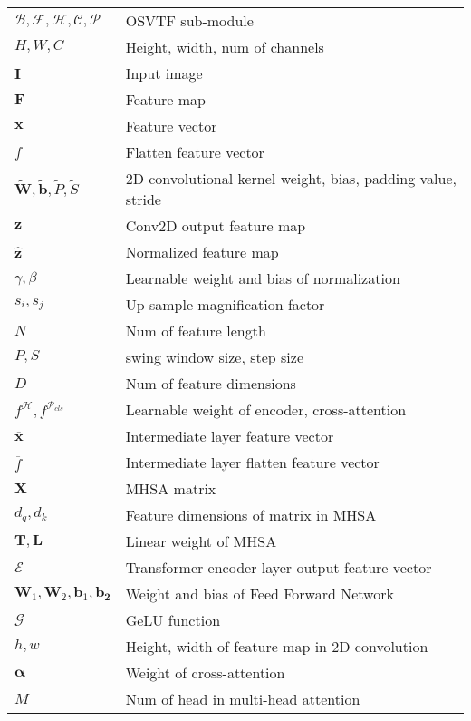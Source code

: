 \begin{tabular}{@{} l @{\hspace{3em}} l @{}}
    $\mathcal{B}, \mathcal{F}, \mathcal{H}, \mathcal{C}, \mathcal{P}$ & OSVTF sub-module \\
    $H, W, C$ & Height, width, num of channels \\
    $\mathbf{I}$ & Input image \\
    $\mathbf{F}$ & Feature map \\
    $\boldsymbol{x}$ & Feature vector \\
    $f$ & Flatten feature vector \\
    $\tilde{\mathbf{W}}, \tilde{\mathbf{b}}, \tilde{P}, \tilde{S}$ & 2D convolutional kernel weight, bias, padding value, stride \\
    $\mathbf{z}$ & Conv2D output feature map \\
    $\hat{\mathbf{z}}$ & Normalized feature map \\
    $\gamma, \beta$ & Learnable weight and bias of normalization \\
    $s_i, s_j$ & Up-sample magnification factor \\
    $N$ & Num of feature length \\
    $P, S$ & swing window size, step size \\
    $D$ & Num of feature dimensions \\
    $f^\mathcal{H}, f^{\mathcal{P}_{cls}}$ & Learnable weight of encoder, cross-attention \\
    $\overline{\boldsymbol{x}}$ & Intermediate layer feature vector \\
    $\overline{f}$ & Intermediate layer flatten feature vector \\
    $\boldsymbol{X}$ & MHSA matrix \\
    $d_q, d_k$ & Feature dimensions of matrix in MHSA \\
    $\mathbf{T}, \mathbf{L}$ & Linear weight of MHSA \\
    $\mathcal{E}$ & Transformer encoder layer output feature vector \\
    $\mathbf{W}_1, \mathbf{W}_2, \mathbf{b}_1, \mathbf{b_2}$ & Weight and bias of Feed Forward Network \\
    $\mathcal{G}$ & GeLU function \\
    $h, w$ & Height, width of feature map in 2D convolution \\
    $\boldsymbol{\alpha}$ & Weight of cross-attention \\
    $M$ & Num of head in multi-head attention \\

\end{tabular}

